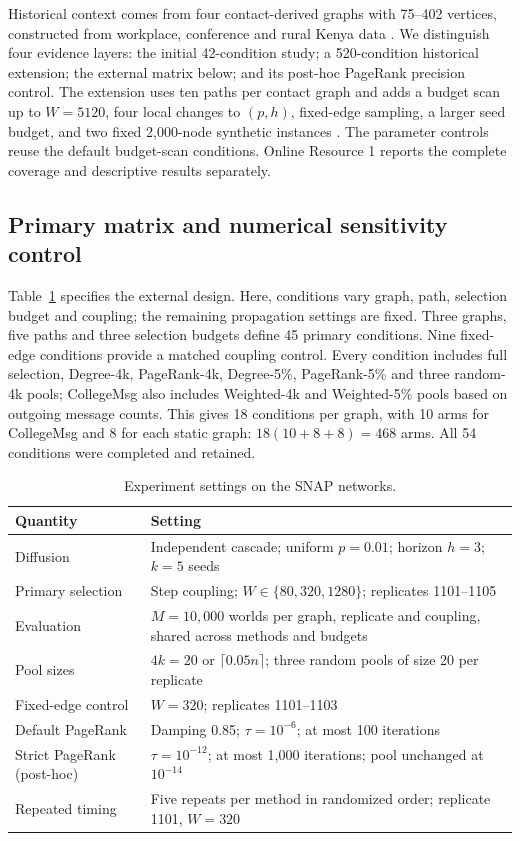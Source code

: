 \documentclass[smallextended]{svjour3}
\begin{document}
Historical context comes from four contact-derived graphs with 75--402 vertices, constructed from workplace, conference and rural Kenya data \cite{ref3,ref4,ref5,ref6}. We distinguish four evidence layers: the initial 42-condition study; a 520-condition historical extension; the external matrix below; and its post-hoc PageRank precision control. The extension uses ten paths per contact graph and adds a budget scan up to $W=5120$, four local changes to $(p,h)$, fixed-edge sampling, a larger seed budget, and two fixed 2,000-node synthetic instances \cite{ref17,ref18}. The parameter controls reuse the default budget-scan conditions. Online Resource 1 reports the complete coverage and descriptive results separately.

\subsection{Primary matrix and numerical sensitivity control}
Table~\ref{tab:settings} specifies the external design. Here, conditions vary graph, path, selection budget and coupling; the remaining propagation settings are fixed. Three graphs, five paths and three selection budgets define 45 primary conditions. Nine fixed-edge conditions provide a matched coupling control. Every condition includes full selection, Degree-4k, PageRank-4k, Degree-5\%, PageRank-5\% and three random-4k pools; CollegeMsg also includes Weighted-4k and Weighted-5\% pools based on outgoing message counts. This gives 18 conditions per graph, with 10 arms for CollegeMsg and 8 for each static graph: $18(10+8+8)=468$ arms. All 54 conditions were completed and retained.

\begin{table}[htbp]
\caption{Experiment settings on the SNAP networks.}\label{tab:settings}
\begin{tabularx}{\linewidth}{lX}
\toprule
Quantity & Setting \\
\midrule
Diffusion & Independent cascade; uniform $p=0.01$; horizon $h=3$; $k=5$ seeds \\
Primary selection & Step coupling; $W\in\{80,320,1280\}$; replicates 1101--1105 \\
Evaluation & $M=10{,}000$ worlds per graph, replicate and coupling, shared across methods and budgets \\
Pool sizes & $4k=20$ or $\lceil0.05n\rceil$; three random pools of size 20 per replicate \\
Fixed-edge control & $W=320$; replicates 1101--1103 \\
Default PageRank & Damping 0.85; $\tau=10^{-6}$; at most 100 iterations \\
Strict PageRank (post-hoc) & $\tau=10^{-12}$; at most 1,000 iterations; pool unchanged at $10^{-14}$ \\
Repeated timing & Five repeats per method in randomized order; replicate 1101, $W=320$ \\
\bottomrule
\end{tabularx}
\end{table}
\end{document}
